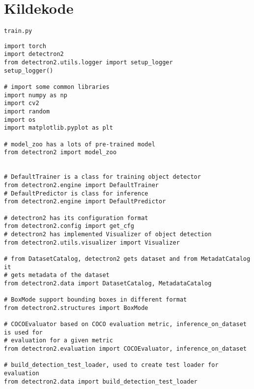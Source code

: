 \clearpage
\appendix
{}
\setcounter{page}{1}

\pagestyle{fancy}

\section{Kildekode}
\label{appendix:code}

\begin{verbatim}
train.py
\end{verbatim}

\begin{verbatim}
import torch
import detectron2
from detectron2.utils.logger import setup_logger
setup_logger()

# import some common libraries
import numpy as np
import cv2
import random
import os
import matplotlib.pyplot as plt

# model_zoo has a lots of pre-trained model
from detectron2 import model_zoo


# DefaultTrainer is a class for training object detector
from detectron2.engine import DefaultTrainer
# DefaultPredictor is class for inference
from detectron2.engine import DefaultPredictor

# detectron2 has its configuration format
from detectron2.config import get_cfg
# detectron2 has implemented Visualizer of object detection
from detectron2.utils.visualizer import Visualizer

# from DatasetCatalog, detectron2 gets dataset and from MetadatCatalog it
# gets metadata of the dataset
from detectron2.data import DatasetCatalog, MetadataCatalog

# BoxMode support bounding boxes in different format
from detectron2.structures import BoxMode

# COCOEvaluator based on COCO evaluation metric, inference_on_dataset is used for
# evaluation for a given metric
from detectron2.evaluation import COCOEvaluator, inference_on_dataset

# build_detection_test_loader, used to create test loader for evaluation
from detectron2.data import build_detection_test_loader
\end{verbatim}



